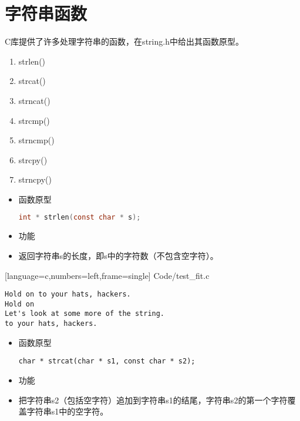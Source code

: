 \section{字符串函数}

\begin{frame}[fragile]\ft{\secname} 
C库提供了许多处理字符串的函数，在{\tf string.h}中给出其函数原型。
\begin{enumerate}
\item {\tf strlen() }
\item {\tf strcat() }
\item {\tf strncat() }
\item {\tf strcmp() }
\item {\tf strncmp()} 
\item {\tf strcpy() }
\item {\tf strncpy()}
\end{enumerate}
\end{frame}


\begin{frame}[fragile]
  \begin{itemize}
  \item \textcolor{acolor1}{函数原型}
    \begin{lstlisting}[language=c,backgroundcolor=\color{red!20}]
      int * strlen(const char * s);
    \end{lstlisting}
  \item    \textcolor{acolor1}{功能}
  \item[] 返回字符串{\tf s}的长度，即{\tf s}中的字符数（不包含空字符）。
  \end{itemize}

\end{frame}

\begin{frame}

[language=c,numbers=left,frame=single]
{Code/test_fit.c}
\end{frame}

\begin{frame}[fragile]
\begin{lstlisting}[backgroundcolor=\color{blue!20}]
Hold on to your hats, hackers.
Hold on
Let's look at some more of the string.
to your hats, hackers.
\end{lstlisting}
\end{frame}

\begin{frame}[fragile]
  \begin{itemize}
    \item \textcolor{acolor1}{函数原型}
      \begin{lstlisting}[backgroundcolor=\color{red!20}]
      char * strcat(char * s1, const char * s2);
      \end{lstlisting}
    \item \textcolor{acolor1}{功能}
    \item[] 把字符串{\tf s2}（包括空字符）追加到字符串{\tf s1}的结尾，字符串{\tf s2}的第一个字符覆盖字符串{\tf s1}中的空字符。
    \end{itemize}
\end{frame}


